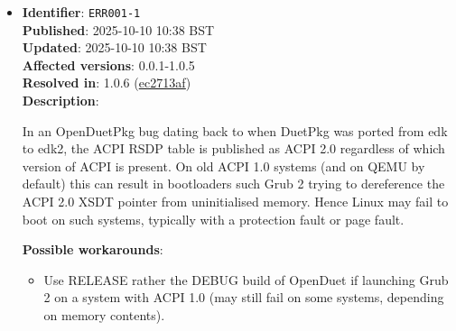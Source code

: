 \documentclass[]{article}
\providecommand{\tightlist}{%
  \setlength{\itemsep}{0pt}\setlength{\parskip}{0pt}}
\begin{document}
\begin{itemize}
\begin{itemize}
    \item Enable \texttt{SyncRuntimePermissions} quirk.

  \end{itemize}

\item
  \textbf{Identifier}: \texttt{ERR001-1} \\
  \textbf{Published}: 2025-10-10 10:38 BST \\
  \textbf{Updated}: 2025-10-10 10:38 BST \\
  \textbf{Affected versions}: 0.0.1-1.0.5 \\
  \textbf{Resolved in}: 1.0.6 (\href{https://github.com/acidanthera/OpenCorePkg/commit/ec2713af48a0538a4a56e4e304d699b847d78194}{ec2713af}) \\
  \textbf{Description}:

  In an OpenDuetPkg bug dating back to when DuetPkg was ported from edk to edk2, the ACPI RSDP table
  is published as ACPI 2.0 regardless of which version of ACPI is present. On old ACPI 1.0 systems
  (and on QEMU by default) this can result in bootloaders such Grub 2 trying to dereference the
  ACPI 2.0 XSDT pointer from uninitialised memory. Hence Linux may fail to boot on such systems,
  typically with a protection fault or page fault.

  \textbf{Possible workarounds}:
  \begin{itemize}
    \tightlist

    \item Use RELEASE rather the DEBUG build of OpenDuet if launching Grub 2 on a system with
    ACPI 1.0 (may still fail on some systems, depending on memory contents).

  \end{itemize}

\end{itemize}
\end{document}
